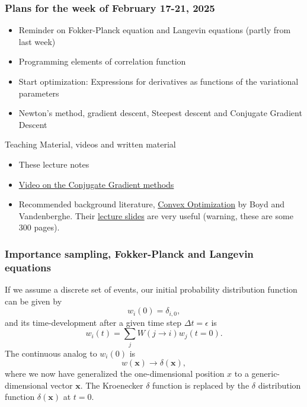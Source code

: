 \documentclass{beamer}
\begin{document}
\begin{frame}
\frametitle{Plans for the week of February 17-21, 2025}

\begin{block}{}
\begin{itemize}
\item Reminder on Fokker-Planck equation and Langevin equations (partly from last week)

\item Programming elements of correlation function

\item Start optimization: Expressions for derivatives as functions of the variational parameters

\item Newton's method, gradient descent, Steepest descent and Conjugate Gradient Descent 
\end{itemize}

\noindent
\end{block}

\begin{block}{Teaching Material, videos and written material }
\begin{itemize}
\item These lecture notes

\item \href{{https://www.youtube.com/watch?v=eAYohMUpPMA&ab_channel=TomCarlone}}{Video on the Conjugate Gradient methods}

\item Recommended background literature, \href{{https://web.stanford.edu/~boyd/cvxbook/}}{Convex Optimization} by Boyd and Vandenberghe. Their \href{{https://web.stanford.edu/~boyd/cvxbook/bv_cvxslides.pdf}}{lecture slides} are very useful (warning, these are some 300 pages).
\end{itemize}

\noindent
\end{block}
\end{frame}

\begin{frame}
\frametitle{Importance sampling, Fokker-Planck and Langevin equations}

If we assume a discrete set of events,
our initial probability
distribution function can be  given by 
\[
   w_i(0) = \delta_{i,0},
\]
and its time-development after a given time step $\Delta t=\epsilon$ is
\[ 
   w_i(t) = \sum_{j}W(j\rightarrow i)w_j(t=0).
\] 
The continuous analog to $w_i(0)$ is
\[
   w(\mathbf{x})\rightarrow \delta(\mathbf{x}),
\]
where we now have generalized the one-dimensional position $x$ to a generic-dimensional  
vector $\mathbf{x}$. The Kroenecker $\delta$ function is replaced by the $\delta$ distribution
function $\delta(\mathbf{x})$ at  $t=0$.
\end{frame}
\end{document}
